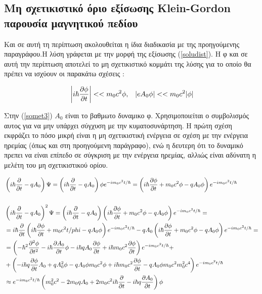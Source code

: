 \subsection{Μη σχετικιστικό όριο εξίσωσης \textlatin{Klein-Gordon} παρουσία μαγνητικού πεδίου}
 
Και σε αυτή τη  περίπτωση ακολουθείται η ίδια διαδικασία με της προηγούμενης παραγράφου.Η λύση γράφεται με την μορφή της εξίσωσης (\ref{soludist}). Η φ και σε αυτή την περίπτωση αποτελεί το μη σχετικιστικό κομμάτι της λύσης για το οποίο θα πρέπει να ισχύουν οι παρακάτω σχέσεις : 

\begin{align}
 & \left| i\hbar\frac{\partial \phi}{\partial t} \right|  << m_0 c^2\phi , & \left| eA_0 \phi \right| << m_0 c^2|\phi|
  \label{somet3}
\end{align}

Στην (\ref{somet3}) $A_0$ είναι το βαθμωτο δυναμικο φ. Χρησιμοποιείται ο συμβολισμός αυτος για να μην υπάρχει σύγχυση με την κυματοσυνάρτηση. Η πρώτη σχέση εκφράζει το πόσο μικρή είναι η μη σχετικιστική ενέργεια σε σχέση με την ενέργεια ηρεμίας (όπως και στη προηγούμενη παράγραφο), ενώ η δευτερη ότι το δυναμικό πρεπει να είναι επίπεδο σε σύγκριση με την ενέργεια ηρεμίας, αλλιώς είναι αδύνατη η μελέτη του μη σχετικιστικού ορίου.  

\begin{align*}
  &\left(  i \hbar \frac{\partial }{\partial t}-q A_0 \right)  \Psi = \left(  i \hbar \frac{\partial }{\partial t}-q A_0 \right)  \phi e^{-im_0c^2t/\hbar }=\left(  i \hbar \frac{\partial \phi}{\partial t} + m_0c^2 \phi -q A_0  \phi\right)  e^{-im_0c^2t/\hbar }
  \\
  \\& \left(  i \hbar \frac{\partial }{\partial t}-q A_0 \right) ^2 \Psi = \left(  i \hbar \frac{\partial }{\partial t}-q A_0 \right)  \left(  i \hbar \frac{\partial \phi}{\partial t} + m_0c^2 \phi -q A_0  \phi\right)  e^{-im_0c^2t/\hbar }=
  \\&= i \hbar \frac{\partial }{\partial t} \left(  i \hbar \frac{\partial \phi}{\partial t} + m_0c^2t /phi -q A_0  \phi\right)  e^{-im_0c^2t/\hbar }-q A_0\left(  i \hbar \frac{\partial \phi}{\partial t} + m_0c^2 \phi -q A_0  \phi\right)  e^{-im_0c^2t/\hbar } =
  \\&=\left(  -\hbar^2 \frac{\partial ^2\phi}{\partial t^2}- i \hbar \frac{\partial  A_0 }{\partial t}\phi -i\hbar q A_0 \frac{\partial \phi}{\partial t}+i\hbar m_0c^2\frac{\partial \phi}{\partial t}\right)  e^{-im_0c^2t/\hbar }+
  \\&+ \left( -i\hbar q \frac{\partial \phi}{\partial t}A_0+qA_0^2\phi-q A_0\phi m_0 c^2 \phi+i\hbar m_0 c^2 \frac{\partial \phi}{\partial t}-q A_0 \phi m_0 c^2 m_0^2 c^4\right)   e^{-im_0c^2t/\hbar }
  \\& \approx e^{-im_0c^2 t/\hbar } \left(  m_0^2c^2-2m_0 q A_0 +2 m_0 c^2 i \hbar \frac{\partial }{\partial t} -i\hbar q \frac{\partial A_0}{\partial t} \right)  \phi
\end{align*}

